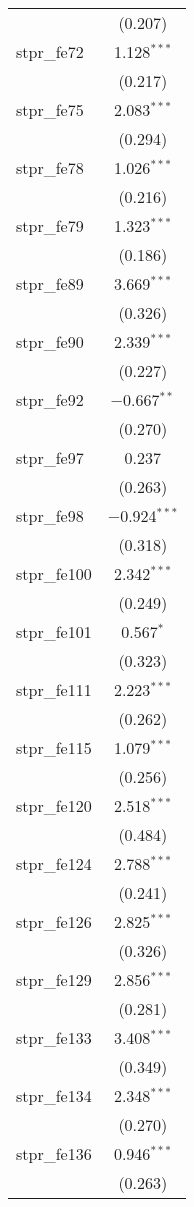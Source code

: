 \begin{table}[!htbp]
\begin{tabular}{@{\extracolsep{5pt}}lc}
  & (0.207) \\ 
  stpr\_fe72 & 1.128$^{***}$ \\ 
  & (0.217) \\ 
  stpr\_fe75 & 2.083$^{***}$ \\ 
  & (0.294) \\ 
  stpr\_fe78 & 1.026$^{***}$ \\ 
  & (0.216) \\ 
  stpr\_fe79 & 1.323$^{***}$ \\ 
  & (0.186) \\ 
  stpr\_fe89 & 3.669$^{***}$ \\ 
  & (0.326) \\ 
  stpr\_fe90 & 2.339$^{***}$ \\ 
  & (0.227) \\ 
  stpr\_fe92 & $-$0.667$^{**}$ \\ 
  & (0.270) \\ 
  stpr\_fe97 & 0.237 \\ 
  & (0.263) \\ 
  stpr\_fe98 & $-$0.924$^{***}$ \\ 
  & (0.318) \\ 
  stpr\_fe100 & 2.342$^{***}$ \\ 
  & (0.249) \\ 
  stpr\_fe101 & 0.567$^{*}$ \\ 
  & (0.323) \\ 
  stpr\_fe111 & 2.223$^{***}$ \\ 
  & (0.262) \\ 
  stpr\_fe115 & 1.079$^{***}$ \\ 
  & (0.256) \\ 
  stpr\_fe120 & 2.518$^{***}$ \\ 
  & (0.484) \\ 
  stpr\_fe124 & 2.788$^{***}$ \\ 
  & (0.241) \\ 
  stpr\_fe126 & 2.825$^{***}$ \\ 
  & (0.326) \\ 
  stpr\_fe129 & 2.856$^{***}$ \\ 
  & (0.281) \\ 
  stpr\_fe133 & 3.408$^{***}$ \\ 
  & (0.349) \\ 
  stpr\_fe134 & 2.348$^{***}$ \\ 
  & (0.270) \\ 
  stpr\_fe136 & 0.946$^{***}$ \\ 
  & (0.263) \\ 

\end{tabular}
\end{table}
